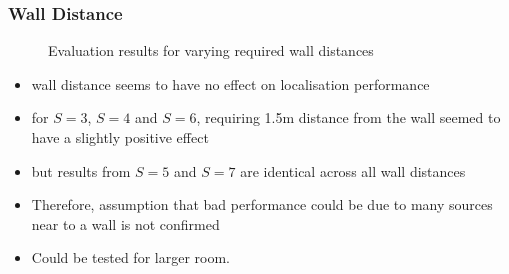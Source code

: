 \subsubsection{Wall Distance}

\begin{figure}[H]
    \setlength\figureheight{7cm}
    \small
    \setlength\figurewidth{\textwidth}
	\centering
	\begin{tikzpicture}
	    \footnotesize
	    
	    
	\end{tikzpicture}
	
	\caption[Evaluation results for varying required wall distances]{Evaluation results for varying required wall distances}
	\label{fig:trial1}
\end{figure}

\begin{itemize}
    \item wall distance seems to have no effect on localisation performance
    \item for $S=3$, $S=4$ and $S=6$, requiring 1.5m distance from the wall seemed to have a slightly positive effect
    \item but results from $S=5$ and $S=7$ are identical across all wall distances
    \item Therefore, assumption that bad performance could be due to many sources near to a wall is not confirmed
    \item Could be tested for larger room.
\end{itemize}